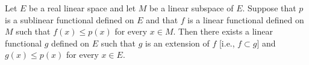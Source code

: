 Let $E$ be a real linear space and let $M$ be a linear subspace of $E$. Suppose that $p$ is a sublinear functional defined on $E$ and that $f$ is a linear functional defined on $M$ such that $f(x) \le p(x)$ for every $x \in M$. Then there exists a linear functional $g$ defined on $E$ such that $g$ is an extension of $f$ [i.e., $f \subset g$] and $g(x) \le p(x)$ for every $x \in E$.
